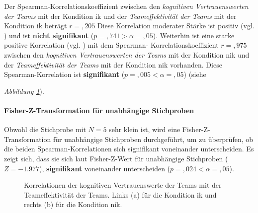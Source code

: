 \documentclass[a4paper,11pt]{article}%
\renewcommand{\\}{\vspace*{0.5\baselineskip} \newline}
\begin{document}
{{{{{{{{Der Spearman-Korrelationskoeffizient zwischen den \textit{kognitiven Vertrauenswerten der Teams} mit der Kondition \ac{ik} und der \textit{Teameffektivität der Teams} mit der Kondition \ac{ik} beträgt $r =,205$ Diese Korrelation moderater Stärke ist positiv (vgl. \citep{cohen2013statistical}) und ist \textbf{nicht signifikant} ($p =,741 > \alpha = ,05$). \\
Weiterhin ist eine starke positive Korrelation (vgl. \citep{cohen2013statistical}) mit dem Spearman- Korrelationskoeffizient $r =,975$ zwischen den \textit{kognitiven Vertrauenswerten der Teams} mit der Kondition \newline \ac{nik} und der \textit{Teameffektivität der Teams} mit der Kondition \ac{nik} vorhanden. Diese Spearman-Korrelation ist \textbf{signifikant} ($p =,005 < \alpha = ,05$) (siehe {\textit{Abbildung \ref{H3_Korrelation_Auswertung}}).

\paragraph{Fisher-Z-Transformation für unabhängige Stichproben}
Obwohl die Stichprobe mit $N=5$ sehr klein ist, wird eine Fisher-Z-Transformation für unabhängige Stichproben durchgeführt, um zu überprüfen, ob die beiden Spearman-Korrelationen sich signifikant voneinander unterscheiden.
Es zeigt sich, dass sie sich laut Fisher-Z-Wert für unabhängige Stichproben ($Z=-1.977$), \textbf{signifikant} voneinander unterscheiden ($p =,024 < \alpha = ,05$).

\begin{figure}[h]
  \centering
  \qquad
  \caption[Korrelationen der kognitiven Vertrauenswerte der Teams mit der Teameffektivität der Teams]{Korrelationen der kognitiven Vertrauenswerte der Teams mit der Teameffektivität der Teams. Links (a) für die Kondition \ac{ik} und rechts (b) für die Kondition \ac{nik}.}
  \label{H3_Korrelation_Auswertung}
\end{figure}

}}}}}}}}}
\end{document}
